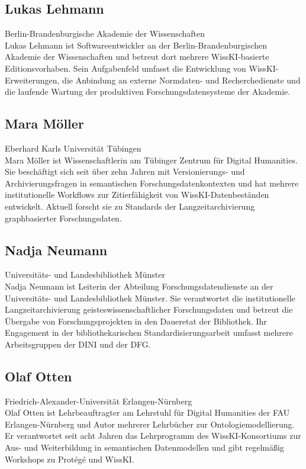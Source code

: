 \subsection*{Lukas Lehmann}
\noindent\small Berlin-Brandenburgische Akademie der Wissenschaften \\
Lukas Lehmann ist Softwareentwickler an der Berlin-Brandenburgischen Akademie der Wissenschaften und betreut dort mehrere WissKI-basierte Editionsvorhaben. Sein Aufgabenfeld umfasst die Entwicklung von WissKI-Erweiterungen, die Anbindung an externe Normdaten- und Recherchedienste und die laufende Wartung der produktiven Forschungsdatensysteme der Akademie.

\subsection*{Mara Möller}
\noindent\small Eberhard Karls Universität Tübingen \\
Mara Möller ist Wissenschaftlerin am Tübinger Zentrum für Digital Humanities. Sie beschäftigt sich seit über zehn Jahren mit Versionierungs- und Archivierungsfragen in semantischen Forschungsdatenkontexten und hat mehrere institutionelle Workflows zur Zitierfähigkeit von WissKI-Datenbeständen entwickelt. Aktuell forscht sie zu Standards der Langzeitarchivierung graphbasierter Forschungsdaten.

\subsection*{Nadja Neumann}
\noindent\small Universitäts- und Landesbibliothek Münster \\
Nadja Neumann ist Leiterin der Abteilung Forschungsdatendienste an der Universitäts- und Landesbibliothek Münster. Sie verantwortet die institutionelle Langzeitarchivierung geisteswissenschaftlicher Forschungsdaten und betreut die Übergabe von Forschungsprojekten in den Daueretat der Bibliothek. Ihr Engagement in der bibliothekarischen Standardisierungsarbeit umfasst mehrere Arbeitsgruppen der DINI und der DFG.

\subsection*{Olaf Otten}
\noindent\small Friedrich-Alexander-Universität Erlangen-Nürnberg \\
Olaf Otten ist Lehrbeauftragter am Lehrstuhl für Digital Humanities der FAU Erlangen-Nürnberg und Autor mehrerer Lehrbücher zur Ontologiemodellierung. Er verantwortet seit acht Jahren das Lehrprogramm des WissKI-Konsortiums zur Aus- und Weiterbildung in semantischen Datenmodellen und gibt regelmäßig Workshops zu Protégé und WissKI.

